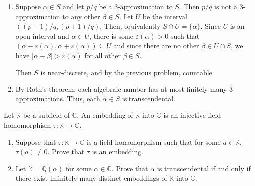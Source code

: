 \documentclass[12 pt, letterpaper]{hmcpset}
\begin{document}
\begin{solution}
	\begin{enumerate}
		\item Suppose $\alpha \in S$ and let $p / q$ be a $3$-approximation to $S$. Then $p / q$ is not a $3$-approximation to any other $\beta \in S$. Let $U$ be the interval $((p - 1) / q, (p + 1) / q)$. Then, equivalently $S \cap U  = \{ \alpha \}$. Since $U$ is an open interval and $\alpha \in U$, there is some $\varepsilon(\alpha) > 0$ such that $(\alpha - \varepsilon(\alpha), \alpha + \varepsilon(\alpha)) \subseteq U$ and since there are no other $\beta \in U \cap S$, we have $\lvert \alpha - \beta \rvert > \varepsilon(\alpha)$ for all other $\beta \in S$.

			Then $S$ is near-discrete, and by the previous problem, countable.

		\item By Roth's theorem, each algebraic number has at most finitely many $3$-approximations. Thus, each $\alpha \in S$ is transcendental.
	\end{enumerate}
\end{solution}

\pagebreak

\begin{problem}[Problem 5.]
	Let $\mathbb{K}$ be a subfield of $\mathbb{C}$. An embedding of $\mathbb{K}$ into $\mathbb{C}$ is an injective field homomorphism $\tau : \mathbb{K} \to \mathbb{C}$.
	\begin{enumerate}
		\item Suppose that $\tau : \mathbb{K} \to \mathbb{C}$ is a field homomorphism such that for some $a \in \mathbb{K}$, $\tau(a) \neq 0$. Prove that $\tau$ is an embedding.

		\item Let $\mathbb{K} = \mathbb{Q}(\alpha)$ for some $\alpha \in \mathbb{C}$. Prove that $\alpha$ is transcendental if and only if there exist infinitely many distinct embeddings of $\mathbb{K}$ into $\mathbb{C}$.
	\end{enumerate}
\end{problem}
\end{document}
